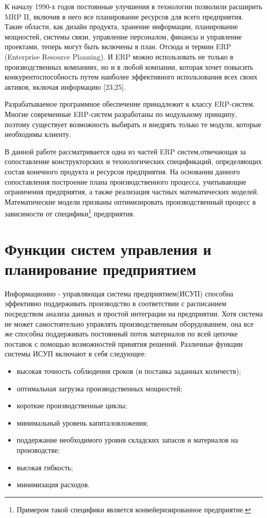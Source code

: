 К началу 1990-х годов постоянные улучшения в технологии позволили расширить MRP II, включив в него все планирование ресурсов для всего предприятия. Такие области, как дизайн продукта, хранение информации, планирование мощностей, системы связи, управление персоналом, финансы и управление проектами, теперь могут быть включены в план. Отсюда и термин ERP (Enterprise Resource Planning). И ERP можно использовать не только в производственных компаниях, но и в любой компании, которая хочет повысить конкурентоспособность путем наиболее эффективного использования всех своих активов, включая информацию \cite{ptak_schragenheim_2004} [23,25].

Разрабатываемое программное обеспечение принадлежит к классу ERP-систем. Многие современные ERP-систем разработаны по модульному принципу, поэтому существует возможность выбирать и внедрять только те модули, которые необходимы клиенту. 

В данной работе рассматривается одна из частей ERP систем,отвечающая за сопоставление конструкторских и технологических спецификаций, определяющих состав конечного продукта и ресурсов предприятия. На основании данного сопоставления построение плана производственного процесса, учитывающие ограничения предприятия, а также реализация частных математических моделей. Математические модели призваны оптимизировать производственный процесс в зависимости от специфики\footnote{Примером такой специфики является конвейеризированное предприятие.} предприятия.

\section{Функции систем управления и планирование предприятием}

Информационно - управляющая система предприятием(ИСУП) способна эффективно поддерживать производство в соответствии с расписанием посредством анализа данных и простой интеграции на предприятии. Хотя система не может самостоятельно управлять производственным оборудованием, она все же способна поддерживать постоянный поток материалов по всей цепочке поставок с помощью возможностей принятия решений. Различные функции системы ИСУП включают в себя следующее:

\begin{itemize}
    \item высокая точность соблюдения сроков (и поставка заданных количеств);
    \item оптимальная загрузка производственных мощностей;
    \item короткие производственные циклы;
    \item минимальный уровень капиталовложения;
    \item поддержание необходимого уровня складских запасов и материалов на производстве;
    \item высокая гибкость;
    \item минимизация расходов.
\end{itemize}

